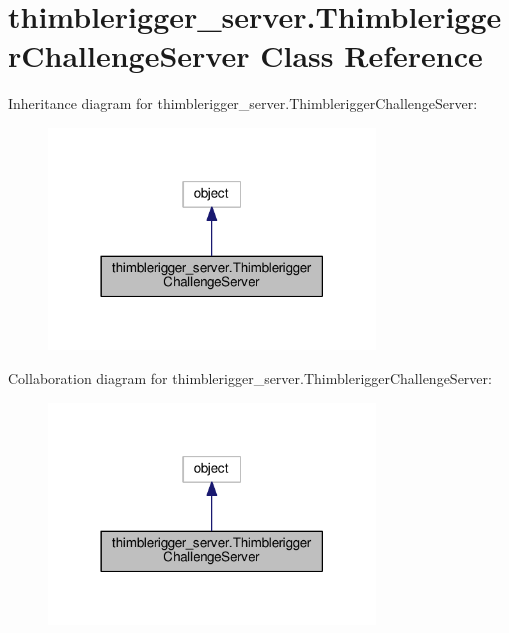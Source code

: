 \hypertarget{classthimblerigger__server_1_1ThimbleriggerChallengeServer}{}\section{thimblerigger\+\_\+server.\+Thimblerigger\+Challenge\+Server Class Reference}
\label{classthimblerigger__server_1_1ThimbleriggerChallengeServer}


Inheritance diagram for thimblerigger\+\_\+server.\+Thimblerigger\+Challenge\+Server\+:
\nopagebreak
\begin{figure}[H]
\begin{center}
\leavevmode
\includegraphics[width=246pt]{classthimblerigger__server_1_1ThimbleriggerChallengeServer__inherit__graph}
\end{center}
\end{figure}


Collaboration diagram for thimblerigger\+\_\+server.\+Thimblerigger\+Challenge\+Server\+:
\nopagebreak
\begin{figure}[H]
\begin{center}
\leavevmode
\includegraphics[width=246pt]{classthimblerigger__server_1_1ThimbleriggerChallengeServer__coll__graph}
\end{center}
\end{figure}
